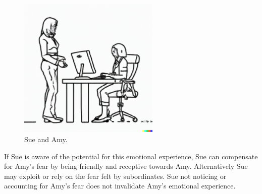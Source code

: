 \begin{figure}[H]
    \centering
\includegraphics[width=0.6\textwidth]{images/female_supervisor_standing_while_talking_to_seated_female_employee_typing_on_keyboard.pdf}
    \caption{Sue and Amy.}
    \label{fig:subordinate_and_supervisor}
\end{figure}



If Sue is aware of the potential for this emotional experience, Sue can compensate for Amy's fear by being friendly and receptive towards Amy. Alternatively Sue may exploit or rely on the fear felt by subordinates. Sue not noticing or accounting for Amy's fear does not invalidate Amy's emotional experience.





